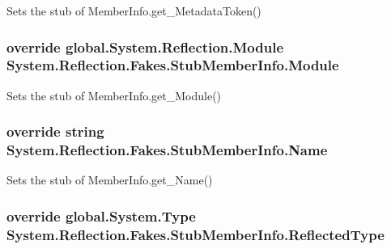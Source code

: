 Sets the stub of Member\-Info.\-get\-\_\-\-Metadata\-Token()

\hypertarget{class_system_1_1_reflection_1_1_fakes_1_1_stub_member_info_aedf2c8a19d43410109af0ae28e825d16}{
\subsubsection[{Module}]{\setlength{\rightskip}{0pt plus 5cm}override global.\-System.\-Reflection.\-Module System.\-Reflection.\-Fakes.\-Stub\-Member\-Info.\-Module\hspace{0.3cm}{\ttfamily [get]}}}\label{class_system_1_1_reflection_1_1_fakes_1_1_stub_member_info_aedf2c8a19d43410109af0ae28e825d16}


Sets the stub of Member\-Info.\-get\-\_\-\-Module()

\hypertarget{class_system_1_1_reflection_1_1_fakes_1_1_stub_member_info_a1f35750b2acc1331812146af0b8b15fc}{
\subsubsection[{Name}]{\setlength{\rightskip}{0pt plus 5cm}override string System.\-Reflection.\-Fakes.\-Stub\-Member\-Info.\-Name\hspace{0.3cm}{\ttfamily [get]}}}\label{class_system_1_1_reflection_1_1_fakes_1_1_stub_member_info_a1f35750b2acc1331812146af0b8b15fc}


Sets the stub of Member\-Info.\-get\-\_\-\-Name()

\hypertarget{class_system_1_1_reflection_1_1_fakes_1_1_stub_member_info_a8da5f1d504a17897f4c4ade195eccea9}{
\subsubsection[{Reflected\-Type}]{\setlength{\rightskip}{0pt plus 5cm}override global.\-System.\-Type System.\-Reflection.\-Fakes.\-Stub\-Member\-Info.\-Reflected\-Type\hspace{0.3cm}{\ttfamily [get]}}}\label{class_system_1_1_reflection_1_1_fakes_1_1_stub_member_info_a8da5f1d504a17897f4c4ade195eccea9}


